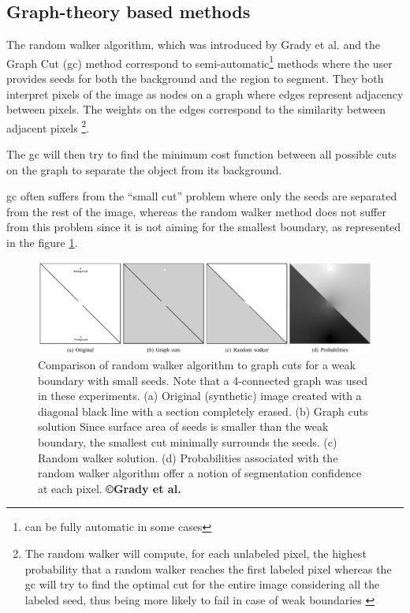 \subsection{Graph-theory based methods}

The random walker algorithm, which was introduced by Grady et al. \cite{Grady2006} and the Graph Cut (\ac{gc}) method correspond to
semi-automatic\footnote{can be fully automatic in some cases} methods where the user provides seeds for both the
background and the region to segment. They both interpret pixels of the
image as nodes on a graph where edges represent adjacency between
pixels. The weights on the edges correspond to the similarity between
adjacent pixels \footnote{The random walker will compute, 
for each unlabeled pixel, the highest probability 
that a random walker reaches the first labeled pixel 
whereas the \ac{gc} will try to find the optimal cut for the entire image 
considering all the labeled seed, thus being more likely 
to fail in case of weak boundaries \cite{Grady2006}}.

The \ac{gc} will then try to find the minimum cost function between all
possible cuts on the graph to separate the object from its background.

\ac{gc} often suffers from the ``small cut'' problem where only the seeds are
separated from the rest of the image, whereas the random walker method
does not suffer from this problem since it is not aiming for the
smallest boundary, as represented in the figure \ref{Grady2006_Fig5}.

\begin{figure}[th!]
	\centering
	\includegraphics[width=0.8\linewidth]{images/Grady2005_Fig5_v3}
	\caption{Comparison of random walker algorithm to graph cuts for a weak boundary with small seeds. Note that a 4-connected graph was used in these experiments. (a) Original (synthetic) image created with a diagonal black line with a section completely erased. (b) Graph cuts solution Since surface area of seeds is smaller than the weak boundary, the smallest cut minimally surrounds the seeds. (c) Random walker solution. (d) Probabilities associated with the random walker algorithm offer a notion of segmentation confidence at each pixel. \textbf{©Grady et al. \cite{Grady2006}}}
	\label{Grady2006_Fig5}
\end{figure}



